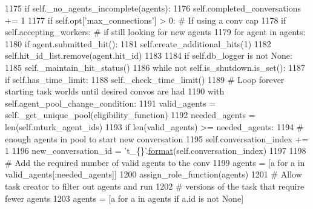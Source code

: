 \begin{DoxyCode}
1175             \textcolor{keywordflow}{if} self.\_no\_agents\_incomplete(agents):
1176                 self.completed\_conversations += 1
1177             \textcolor{keywordflow}{if} self.opt[\textcolor{stringliteral}{'max\_connections'}] > 0:  \textcolor{comment}{# If using a conv cap}
1178                 \textcolor{keywordflow}{if} self.accepting\_workers:  \textcolor{comment}{# if still looking for new agents}
1179                     \textcolor{keywordflow}{for} agent \textcolor{keywordflow}{in} agents:
1180                         \textcolor{keywordflow}{if} agent.submitted\_hit():
1181                             self.create\_additional\_hits(1)
1182                             self.hit\_id\_list.remove(agent.hit\_id)
1183 
1184         \textcolor{keywordflow}{if} self.db\_logger \textcolor{keywordflow}{is} \textcolor{keywordflow}{not} \textcolor{keywordtype}{None}:
1185             self.\_maintain\_hit\_status()
1186         \textcolor{keywordflow}{while} \textcolor{keywordflow}{not} self.is\_shutdown.is\_set():
1187             \textcolor{keywordflow}{if} self.has\_time\_limit:
1188                 self.\_check\_time\_limit()
1189             \textcolor{comment}{# Loop forever starting task worlds until desired convos are had}
1190             with self.agent\_pool\_change\_condition:
1191                 valid\_agents = self.\_get\_unique\_pool(eligibility\_function)
1192                 needed\_agents = len(self.mturk\_agent\_ids)
1193                 \textcolor{keywordflow}{if} len(valid\_agents) >= needed\_agents:
1194                     \textcolor{comment}{# enough agents in pool to start new conversation}
1195                     self.conversation\_index += 1
1196                     new\_conversation\_id = \textcolor{stringliteral}{'t\_\{\}'}.\hyperlink{namespaceparlai_1_1chat__service_1_1services_1_1messenger_1_1shared__utils_a32e2e2022b824fbaf80c747160b52a76}{format}(self.conversation\_index)
1197 
1198                     \textcolor{comment}{# Add the required number of valid agents to the conv}
1199                     agents = [a \textcolor{keywordflow}{for} a \textcolor{keywordflow}{in} valid\_agents[:needed\_agents]]
1200                     assign\_role\_function(agents)
1201                     \textcolor{comment}{# Allow task creator to filter out agents and run}
1202                     \textcolor{comment}{# versions of the task that require fewer agents}
1203                     agents = [a \textcolor{keywordflow}{for} a \textcolor{keywordflow}{in} agents \textcolor{keywordflow}{if} a.id \textcolor{keywordflow}{is} \textcolor{keywordflow}{not} \textcolor{keywordtype}{None}]

\end{DoxyCode}
